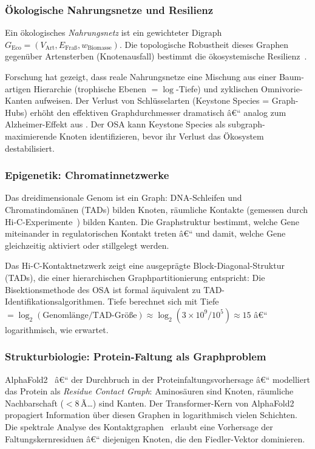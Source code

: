 ﻿\documentclass[12pt,a4paper,twoside]{article}
\theoremstyle{definition}
\theoremstyle{plain}
\theoremstyle{remark}
\begin{document}
\subsubsection{Ökologische Nahrungsnetze und Resilienz}

Ein ökologisches \emph{Nahrungsnetz} ist ein gewichteter
Digraph $G_{\text{Eco}} = (V_{\text{Art}}, E_{\text{Fraß}}, w_{\text{Biomasse}})$.
Die topologische Robustheit dieses Graphen gegenüber
Artensterben (Knotenausfall) bestimmt die ökosystemische
Resilienz~\cite{Dunne2002}.

Forschung hat gezeigt, dass reale Nahrungsnetze eine
Mischung aus einer Baum-artigen Hierarchie (trophische
Ebenen $= \log$-Tiefe) und zyklischen Omnivorie-Kanten aufweisen.
Der Verlust von Schlüsselarten (Keystone Species = Graph-Hubs)
erhöht den effektiven Graphdurchmesser dramatisch â€“
analog zum Alzheimer-Effekt aus .
Der OSA kann Keystone Species als subgraph-maximierende
Knoten identifizieren, bevor ihr Verlust das Ökosystem destabilisiert.

\subsubsection{Epigenetik: Chromatinnetzwerke}

Das dreidimensionale Genom ist ein Graph: DNA-Schleifen und
Chromatindomänen (TADs) bilden Knoten, räumliche Kontakte
(gemessen durch Hi-C-Experimente~\cite{Lieberman2009}) bilden
Kanten.  Die Graphstruktur bestimmt, welche Gene miteinander
in regulatorischen Kontakt treten â€“ und damit, welche Gene
gleichzeitig aktiviert oder stillgelegt werden.

Das Hi-C-Kontaktnetzwerk zeigt eine ausgeprägte
Block-Diagonal-Struktur (TADs), die einer hierarchischen
Graphpartitionierung entspricht: Die Bisektionsmethode des OSA
ist formal äquivalent zu TAD-Identifikationsalgorithmen.
Tiefe berechnet sich mit Tiefe $= \log_2(\text{Genomlänge}/\text{TAD-Größe}) \approx
\log_2(3 \times 10^9 / 10^5) \approx 15$ â€“ logarithmisch, wie
erwartet.

\subsubsection{Strukturbiologie: Protein-Faltung als Graphproblem}

AlphaFold2~\cite{Jumper2021} â€“ der Durchbruch in der
Proteinfaltungsvorhersage â€“ modelliert das Protein als
\emph{Residue Contact Graph}: Aminosäuren sind Knoten,
räumliche Nachbarschaft ($< 8\,$Ã…) sind Kanten.
Der Transformer-Kern von AlphaFold2 propagiert Information
über diesen Graphen in logarithmisch vielen Schichten.
Die spektrale Analyse des Kontaktgraphen~\cite{Vendruscolo2002}
erlaubt eine Vorhersage der Faltungskernresiduen â€“
diejenigen Knoten, die den Fiedler-Vektor dominieren.
\end{document}
